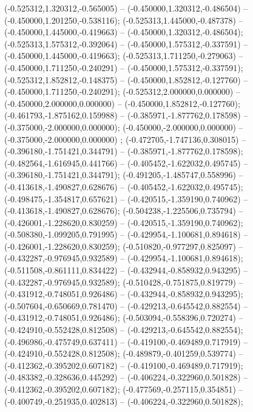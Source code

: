 (-0.525312,1.320312,-0.565005) -- (-0.450000,1.320312,-0.486504) -- (-0.450000,1.201250,-0.538116);
 (-0.525313,1.445000,-0.487378) -- (-0.450000,1.445000,-0.419663) -- (-0.450000,1.320312,-0.486504);
 (-0.525313,1.575312,-0.392064) -- (-0.450000,1.575312,-0.337591) -- (-0.450000,1.445000,-0.419663);
 (-0.525313,1.711250,-0.279063) -- (-0.450000,1.711250,-0.240291) -- (-0.450000,1.575312,-0.337591);
 (-0.525312,1.852812,-0.148375) -- (-0.450000,1.852812,-0.127760) -- (-0.450000,1.711250,-0.240291);
 (-0.525312,2.000000,0.000000) -- (-0.450000,2.000000,0.000000) -- (-0.450000,1.852812,-0.127760);
 (-0.461793,-1.875162,0.159988) -- (-0.385971,-1.877762,0.178598) -- (-0.375000,-2.000000,0.000000);
 (-0.450000,-2.000000,0.000000) -- (-0.375000,-2.000000,0.000000) ;
 (-0.472705,-1.747136,0.308015) -- (-0.396180,-1.751421,0.344791) -- (-0.385971,-1.877762,0.178598);
 (-0.482564,-1.616945,0.441766) -- (-0.405452,-1.622032,0.495745) -- (-0.396180,-1.751421,0.344791);
 (-0.491205,-1.485747,0.558996) -- (-0.413618,-1.490827,0.628676) -- (-0.405452,-1.622032,0.495745);
 (-0.498475,-1.354817,0.657621) -- (-0.420515,-1.359190,0.740962) -- (-0.413618,-1.490827,0.628676);
 (-0.504238,-1.225506,0.735794) -- (-0.426001,-1.228620,0.830259) -- (-0.420515,-1.359190,0.740962);
 (-0.508380,-1.099205,0.791995) -- (-0.429954,-1.100681,0.894618) -- (-0.426001,-1.228620,0.830259);
 (-0.510820,-0.977297,0.825097) -- (-0.432287,-0.976945,0.932589) -- (-0.429954,-1.100681,0.894618);
 (-0.511508,-0.861111,0.834422) -- (-0.432944,-0.858932,0.943295) -- (-0.432287,-0.976945,0.932589);
 (-0.510428,-0.751875,0.819779) -- (-0.431912,-0.748051,0.926486) -- (-0.432944,-0.858932,0.943295);
 (-0.507604,-0.650669,0.781470) -- (-0.429213,-0.645542,0.882554) -- (-0.431912,-0.748051,0.926486);
 (-0.503094,-0.558396,0.720274) -- (-0.424910,-0.552428,0.812508) -- (-0.429213,-0.645542,0.882554);
 (-0.496986,-0.475749,0.637411) -- (-0.419100,-0.469489,0.717919) -- (-0.424910,-0.552428,0.812508);
 (-0.489879,-0.401259,0.539774) -- (-0.412362,-0.395202,0.607182) -- (-0.419100,-0.469489,0.717919);
 (-0.483382,-0.328636,0.445292) -- (-0.406224,-0.322960,0.501828) -- (-0.412362,-0.395202,0.607182);
 (-0.477569,-0.257115,0.354851) -- (-0.400749,-0.251935,0.402813) -- (-0.406224,-0.322960,0.501828);
